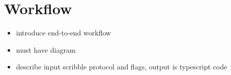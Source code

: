 \section{Workflow}

\begin{itemize}
\item introduce end-to-end workflow
\item must have diagram
\item describe input scribble protocol and flags, output is typescript code
\end{itemize}
